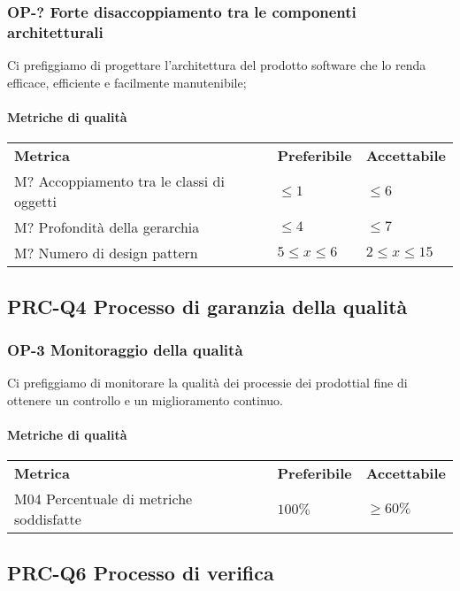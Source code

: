 		\subsubsection{OP-? Forte disaccoppiamento tra le componenti architetturali}
		Ci prefiggiamo di progettare l'architettura del prodotto software che lo renda efficace, efficiente e facilmente manutenibile;
		\paragraph{Metriche di qualità} \mbox{}
		\begin{longtable} {
				>{}p{80mm} 
				>{}p{25mm}
				>{}p{25mm}
			}
			\rowcolor{gray!50}
			\textbf{Metrica} & \textbf{Preferibile} & \textbf{Accettabile} \TBstrut \TBstrut \\
			M? Accoppiamento tra le classi di oggetti & $\le 1$ & $\le 6$ \TBstrut \\ [2mm]
			M? Profondità della gerarchia & $\le 4$ & $\le 7$ \TBstrut \\ [2mm]
			M? Numero di design pattern & $5 \le x \le 6$ & $2 \le x \le 15$ \TBstrut \\ [2mm]
		\end{longtable}
			
	\subsection{PRC-Q4 Processo di garanzia della qualità}
		\subsubsection{OP-3 Monitoraggio della qualità}
			Ci prefiggiamo di monitorare la qualità dei processi\glosp e dei prodotti\glosp al fine di ottenere un controllo e un miglioramento continuo. 
			\paragraph{Metriche di qualità} \mbox{} 
			\begin{longtable} {
					>{}p{80mm} 
					>{}p{25mm}
					>{}p{25mm}
				}
				\rowcolor{gray!50}
				\textbf{Metrica} & \textbf{Preferibile} & \textbf{Accettabile} \TBstrut \TBstrut \\
				M04 Percentuale di metriche soddisfatte & $100\%$ & $\ge 60\%$ \TBstrut \\ [2mm]
			\end{longtable}

	\subsection{PRC-Q6 Processo di verifica}
